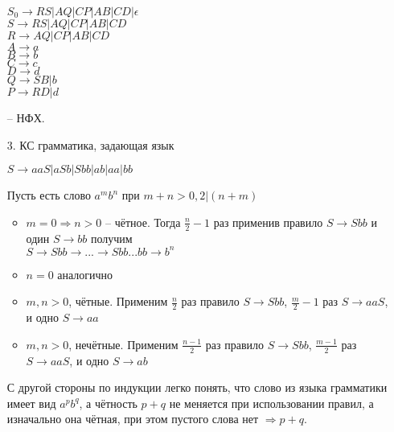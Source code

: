 \documentclass[12pt]{article}
\begin{document}
\begin{enumerate}
\begin{myquote}
$S_0 \to RS|AQ|CP|AB|CD|\epsilon$\\
$S \to RS|AQ|CP|AB|CD$\\
$R \to AQ|CP|AB|CD$\\
$A \to a$\\
$B \to b$\\
$C \to c$\\
$D \to d$\\
$Q \to SB|b$\\
$P \to RD|d$
\end{myquote} -- НФХ.
\item[3.] КС грамматика, задающая язык
\begin{myquote}
$S \to aaS|aSb|Sbb|ab|aa|bb$
\end{myquote}
Пусть есть слово $a^mb^n$ при $m+n>0, 2|(n+m)$
\begin{itemize}
\item $m = 0 \Rightarrow n>0$ -- чётное. Тогда $\frac{n}{2} - 1$ раз применив правило $S \to Sbb$ и один $S \to bb$ получим\\
$S \to Sbb \to ... \to Sbb...bb \to b^n$ 
\item $n=0$ аналогично
\item $m, n > 0$, чётные. Применим $\frac{n}{2}$ раз правило $S \to Sbb$,  $\frac{m}{2}-1$ раз $S \to aaS$, и одно $S \to aa$
\item  $m, n > 0$, нечётные. Применим $\frac{n-1}{2}$ раз правило $S \to Sbb$,  $\frac{m-1}{2}$ раз $S \to aaS$, и одно $S \to ab$
\end{itemize}
С другой стороны по индукции легко понять, что слово из языка грамматики имеет вид $a^pb^q$, а чётность $p+q$ не меняется при использовании правил, а изначально она чётная, при этом пустого слова нет $\Rightarrow p+q$.
 \end{enumerate}
\end{document}
